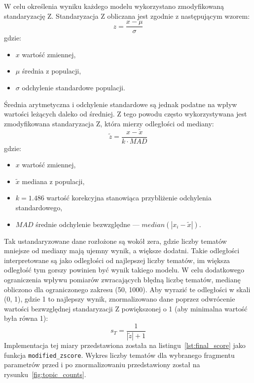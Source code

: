 		W celu określenia wyniku każdego modelu wykorzystano zmodyfikowaną standaryzację Z.
		Standaryzacja Z obliczana jest zgodnie z następującym wzorem:
		\[z=\frac{x-\mu}{\sigma}\]
		gdzie:
		\begin{itemize}
			\item \(x\) wartość zmiennej,
			\item \(\mu\) średnia z populacji,
			\item \(\sigma\) odchylenie standardowe populacji.
		\end{itemize}
		
		Średnia arytmetyczna i odchylenie standardowe są jednak podatne na wpływ wartości leżących daleko od średniej.
		Z tego powodu często wykorzystywana jest zmodyfikowana standaryzacja Z, która mierzy odległości od mediany:
		\[\tilde{z}=\frac{x-\tilde{x}}{k\cdot MAD}\]
		gdzie:
		\begin{itemize}
			\item \(x\) wartość zmiennej,
			\item \(\tilde{x}\) mediana z populacji,
			\item \(k=1.486\) wartość korekcyjna stanowiąca przybliżenie odchylenia standardowego,
			\item \(MAD\) średnie odchylenie bezwzględne --- \(median\left(|x_i-\tilde{x}|\right)\).
		\end{itemize}

		Tak ustandaryzowane dane rozłożone są wokół zera, gdzie liczby tematów mniejsze od mediany mają ujemny wynik, a większe dodatni.
		Takie odległości interpretowane są jako odległości od najlepszej liczby tematów,
			im większa odległość tym gorszy powinien być wynik takiego modelu.
		W celu dodatkowego ograniczenia wpływu pomiarów zwracających błędną liczbę tematów, medianę obliczono dla ograniczonego zakresu (50, 1000).
		Aby wyrazić te odległości w skali (0, 1), gdzie 1 to najlepszy wynik, znormalizowano dane
			poprzez odwrócenie wartości bezwzględnej standaryzacji Z powiększonej o 1 (aby minimalna wartość była równa 1):
		\[s_T=\frac{1}{|\tilde{z}|+1}\]
		Implementacja tej miary przedstawiona została na listingu~\ref{lst:final_score} jako funkcja \verb|modified_zscore|.
		Wykres liczby tematów dla wybranego fragmentu parametrów przed i po znormalizowaniu przedstawiony został na rysunku~\ref{fig:topic_counts}.

